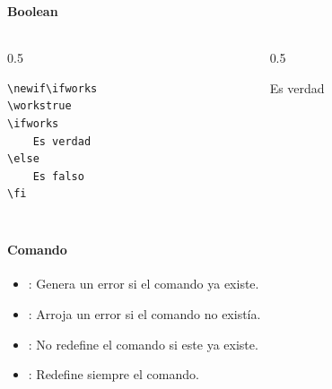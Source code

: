 \documentclass[12pt,aspectratio=169,ignorenonframetext]{ltxbeamer}
\begin{document}





\begin{frame}[fragile]
\frametitle{{\lmr\LaTeXe}}
\framesubtitle{Boolean}

\begin{columns}
    \begin{column}{0.5\textwidth}
        \begin{verbatim}
\newif\ifworks
\workstrue
\ifworks
    Es verdad
\else
    Es falso
\fi
        \end{verbatim}
    \end{column}
    {\color{gray} \vline}
    \begin{column}{0.5\linewidth}
        \lmr%
        \newif\ifworks
        \workstrue
        \ifworks
            Es verdad
        \else
            Es falso
        \fi
    \end{column}
\end{columns}
\end{frame}





\subsection{{\lmr{}}}

\begin{frame}[fragile]
\frametitle{{\lmr{}}}
\framesubtitle{Comando}

\begin{itemize}
    \item \texttt{\NewDocumentCommand}: Genera un error si el comando ya existe.
    \item \texttt{\RenewDocumentCommand}: Arroja un error si el comando no existía.
    \item \texttt{\ProvideDocumentCommand}: No redefine el comando si este ya existe.
    \item \texttt{\DeclareDocumentCommand}: Redefine siempre el comando.
\end{itemize}
\end{frame}
\end{document}
